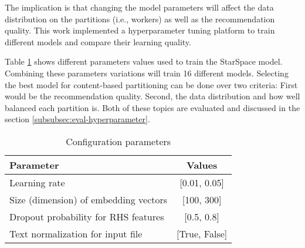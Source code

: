 The implication is that changing the model parameters will affect the data distribution on the partitions (i.e., workers) as well as the recommendation quality. This work implemented a hyperparameter tuning platform to train different models and compare their learning quality.


Table \ref{tab:hyperparameter} shows different parameters values used to train the StarSpace model. Combining these parameters variations will train 16 different models. Selecting the best model for content-based partitioning can be done over two criteria: First would be the recommendation quality. Second, the data distribution and how well balanced each partition is. Both of these topics are evaluated and discussed in the section \ref{subsubsec:eval-hyperparameter}.


\begin{table}[!hb]
    \centering
    \caption{Configuration parameters}
    \label{tab:hyperparameter}
    \begin{tabular}{|l|c|}
        \hline
        \textbf{Parameter} & \textbf{Values} \\
        \hline
        Learning rate & [0.01, 0.05] \\
        \hline
        Size (dimension) of embedding vectors & [100, 300] \\
        \hline
        Dropout probability for RHS features & [0.5, 0.8] \\
        \hline
        Text normalization for input file & [True, False]\\
        \hline
    \end{tabular}
\end{table}

